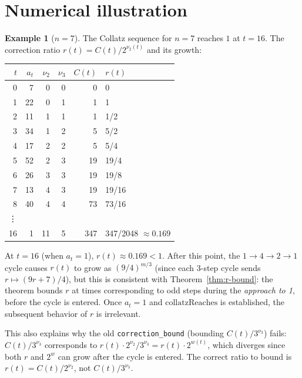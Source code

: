 \documentclass[11pt,a4paper]{article}
\theoremstyle{plain}
\theoremstyle{definition}
\newtheorem{example}[theorem]{Example}
\begin{document}
\section{Numerical illustration}

\begin{example}[$n = 7$]
The Collatz sequence for $n = 7$ reaches $1$ at $t = 16$.  The
correction ratio $r(t) = C(t)/2^{\nu_2(t)}$ and its growth:

\medskip
\begin{center}
\begin{tabular}{r|rrrrl}
$t$ & $a_t$ & $\nu_2$ & $\nu_3$ & $C(t)$ & $r(t)$ \\
\hline
0  & 7  & 0 & 0 & 0   & 0 \\
1  & 22 & 0 & 1 & 1   & 1 \\
2  & 11 & 1 & 1 & 1   & 1/2 \\
3  & 34 & 1 & 2 & 5   & 5/2 \\
4  & 17 & 2 & 2 & 5   & 5/4 \\
5  & 52 & 2 & 3 & 19  & 19/4 \\
6  & 26 & 3 & 3 & 19  & 19/8 \\
7  & 13 & 4 & 3 & 19  & 19/16 \\
8  & 40 & 4 & 4 & 73  & 73/16 \\
\vdots \\
16 & 1  & 11 & 5 & 347 & 347/2048 $\approx 0.169$
\end{tabular}
\end{center}

\medskip
At $t = 16$ (when $a_t = 1$), $r(t) \approx 0.169 < 1$.  After this
point, the $1 \to 4 \to 2 \to 1$ cycle causes $r(t)$ to grow as
$(9/4)^{m/3}$ (since each 3-step cycle sends $r \mapsto (9r+7)/4$),
but this is consistent with Theorem~\ref{thm:r-bound}: the theorem
bounds $r$ at times corresponding to odd steps during the
\emph{approach to 1}, before the cycle is entered.  Once $a_t = 1$
and $\mathrm{collatzReaches}$ is established, the subsequent behavior
of $r$ is irrelevant.

This also explains why the old \texttt{correction\_bound}
(bounding $C(t) / 3^{\nu_3}$) fails: $C(t) / 3^{\nu_3}$ corresponds
to $r(t) \cdot 2^{\nu_2}/3^{\nu_3} = r(t) \cdot 2^{w(t)}$, which
diverges since both $r$ and $2^{w}$ can grow after the cycle is entered.
The correct ratio to bound is $r(t) = C(t)/2^{\nu_2}$, not
$C(t)/3^{\nu_3}$.
\end{example}
\end{document}
